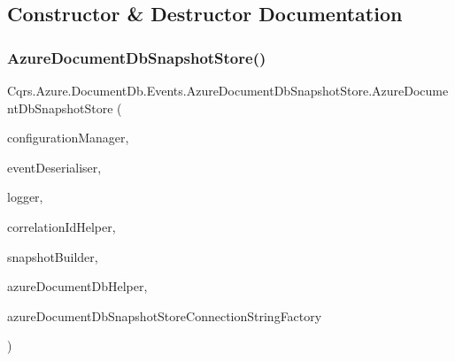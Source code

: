\subsection{Constructor \& Destructor Documentation}
\mbox{\label{classCqrs_1_1Azure_1_1DocumentDb_1_1Events_1_1AzureDocumentDbSnapshotStore_a0a9a2c75989e00d8e7e9bd28cdbaa33e_a0a9a2c75989e00d8e7e9bd28cdbaa33e}} 
\subsubsection{\texorpdfstring{Azure\+Document\+Db\+Snapshot\+Store()}{AzureDocumentDbSnapshotStore()}}
{\footnotesize\ttfamily Cqrs.\+Azure.\+Document\+Db.\+Events.\+Azure\+Document\+Db\+Snapshot\+Store.\+Azure\+Document\+Db\+Snapshot\+Store (\begin{DoxyParamCaption}\item[{\hyperlink{interfaceCqrs_1_1Configuration_1_1IConfigurationManager}{I\+Configuration\+Manager}}]{configuration\+Manager,  }\item[{\hyperlink{interfaceCqrs_1_1Events_1_1ISnapshotDeserialiser}{I\+Snapshot\+Deserialiser}}]{event\+Deserialiser,  }\item[{I\+Logger}]{logger,  }\item[{I\+Correlation\+Id\+Helper}]{correlation\+Id\+Helper,  }\item[{\hyperlink{interfaceCqrs_1_1Events_1_1ISnapshotBuilder}{I\+Snapshot\+Builder}}]{snapshot\+Builder,  }\item[{\hyperlink{interfaceCqrs_1_1Azure_1_1DocumentDb_1_1IAzureDocumentDbHelper}{I\+Azure\+Document\+Db\+Helper}}]{azure\+Document\+Db\+Helper,  }\item[{\hyperlink{interfaceCqrs_1_1Azure_1_1DocumentDb_1_1Events_1_1IAzureDocumentDbSnapshotStoreConnectionStringFactory}{I\+Azure\+Document\+Db\+Snapshot\+Store\+Connection\+String\+Factory}}]{azure\+Document\+Db\+Snapshot\+Store\+Connection\+String\+Factory }\end{DoxyParamCaption})}



